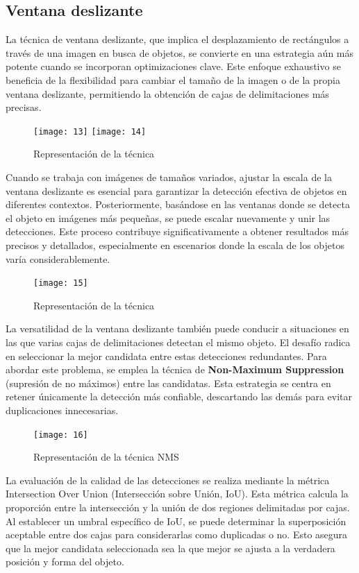 	\subsection{Ventana deslizante}
	La técnica de ventana deslizante, que implica el desplazamiento de rectángulos a través de una imagen en busca de objetos, se convierte en una estrategia aún más potente cuando se incorporan optimizaciones clave. Este enfoque exhaustivo se beneficia de la flexibilidad para cambiar el tamaño de la imagen o de la propia ventana deslizante, permitiendo la obtención de cajas de delimitaciones más precisas.
	
	\begin{figure}[ht]
  		\centering
  		\texttt{[image: 13]}
  		\hspace{0.5cm}
  		\texttt{[image: 14]}
  		\caption{Representación de la técnica}
	\end{figure}

	Cuando se trabaja con imágenes de tamaños variados, ajustar la escala de la ventana deslizante es esencial para garantizar la detección efectiva de objetos en diferentes contextos. Posteriormente, basándose en las ventanas donde se detecta el objeto en imágenes más pequeñas, se puede escalar nuevamente y unir las detecciones. Este proceso contribuye significativamente a obtener resultados más precisos y detallados, especialmente en escenarios donde la escala de los objetos varía considerablemente.

	\begin{figure}[ht]
	    \centering
		\texttt{[image: 15]}
		\caption{Representación de la técnica}
	\end{figure}

	La versatilidad de la ventana deslizante también puede conducir a situaciones en las que varias cajas de delimitaciones detectan el mismo objeto. El desafío radica en seleccionar la mejor candidata entre estas detecciones redundantes. Para abordar este problema, se emplea la técnica de \textbf{Non-Maximum Suppression} (supresión de no máximos) entre las candidatas. Esta estrategia se centra en retener únicamente la detección más confiable, descartando las demás para evitar duplicaciones innecesarias.
	
	\begin{figure}[ht]
	    \centering
		\texttt{[image: 16]}
		\caption{Representación de la técnica NMS}
	\end{figure}
	
	La evaluación de la calidad de las detecciones se realiza mediante la métrica Intersection Over Union (Intersección sobre Unión, IoU). Esta métrica calcula la proporción entre la intersección y la unión de dos regiones delimitadas por cajas. Al establecer un umbral específico de IoU, se puede determinar la superposición aceptable entre dos cajas para considerarlas como duplicadas o no. Esto asegura que la mejor candidata seleccionada sea la que mejor se ajusta a la verdadera posición y forma del objeto.

